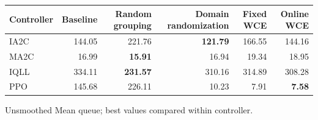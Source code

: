 \begin{tabular}{lrrrrr}
\hline
Controller & Baseline & Random grouping & Domain randomization & Fixed WCE & Online WCE \\
\hline
IA2C & 144.05 & 221.76 & \textbf{121.79} & 166.55 & 144.16 \\
MA2C & 16.99 & \textbf{15.91} & 16.94 & 19.34 & 18.95 \\
IQLL & 334.11 & \textbf{231.57} & 310.16 & 314.89 & 308.28 \\
PPO & 145.68 & 226.11 & 10.23 & 7.91 & \textbf{7.58} \\
\hline
\end{tabular}
Unsmoothed Mean queue; best values compared within controller.
